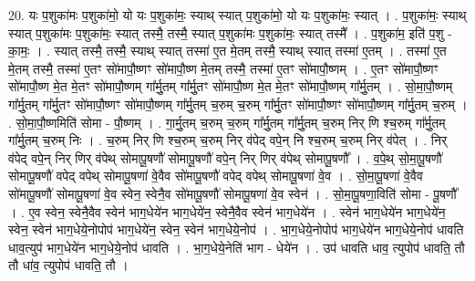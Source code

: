 \documentclass[17pt]{extarticle}
\begin{document}
20. यः प॒शुका॑मः प॒शुका॑मो॒ यो यः प॒शुका॑मः॒ स्याथ् स्यात् प॒शुका॑मो॒ यो यः प॒शुका॑मः॒ स्यात् । . प॒शुका॑मः॒ स्याथ् स्यात् प॒शुका॑मः प॒शुका॑मः॒ स्यात् तस्मै॒ तस्मै॒ स्यात् प॒शुका॑मः प॒शुका॑मः॒ स्यात् तस्मै᳚ । . प॒शुका॑म॒ इति॑ प॒शु - का॒मः॒ । . स्यात् तस्मै॒ तस्मै॒ स्याथ् स्यात् तस्मा॑ ए॒त मे॒तम् तस्मै॒ स्याथ् स्यात् तस्मा॑ ए॒तम् । . तस्मा॑ ए॒त मे॒तम् तस्मै॒ तस्मा॑ ए॒तꣳ सो॑मापौ॒ष्णꣳ सो॑मापौ॒ष्ण मे॒तम् तस्मै॒ तस्मा॑ ए॒तꣳ सो॑मापौ॒ष्णम् । . ए॒तꣳ सो॑मापौ॒ष्णꣳ सो॑मापौ॒ष्ण मे॒त मे॒तꣳ सो॑मापौ॒ष्णम् गा᳚र्मु॒तम् गा᳚र्मु॒तꣳ सो॑मापौ॒ष्ण मे॒त मे॒तꣳ सो॑मापौ॒ष्णम् गा᳚र्मु॒तम् । . सो॒मा॒पौ॒ष्णम् गा᳚र्मु॒तम् गा᳚र्मु॒तꣳ सो॑मापौ॒ष्णꣳ सो॑मापौ॒ष्णम् गा᳚र्मु॒तम् च॒रुम् च॒रुम् गा᳚र्मु॒तꣳ सो॑मापौ॒ष्णꣳ सो॑मापौ॒ष्णम् गा᳚र्मु॒तम् च॒रुम् । . सो॒मा॒पौ॒ष्णमिति॑ सोमा - पौ॒ष्णम् । . गा॒र्मु॒तम् च॒रुम् च॒रुम् गा᳚र्मु॒तम् गा᳚र्मु॒तम् च॒रुम् निर् णि श्च॒रुम् गा᳚र्मु॒तम् गा᳚र्मु॒तम् च॒रुम् निः । . च॒रुम् निर् णि श्च॒रुम् च॒रुम् निर् व॑पेद् वपे॒न् नि श्च॒रुम् च॒रुम् निर् व॑पेत् । . निर् व॑पेद् वपे॒न् निर् णिर् व॑पेथ् सोमापू॒षणौ॑ सोमापू॒षणौ॑ वपे॒न् निर् णिर् व॑पेथ् सोमापू॒षणौ᳚ । . व॒पे॒थ् सो॒मा॒पू॒षणौ॑ सोमापू॒षणौ॑ वपेद् वपेथ् सोमापू॒षणा॑ वे॒वैव सो॑मापू॒षणौ॑ वपेद् वपेथ् सोमापू॒षणा॑ वे॒व । . सो॒मा॒पू॒षणा॑ वे॒वैव सो॑मापू॒षणौ॑ सोमापू॒षणा॑ वे॒व स्वेन॒ स्वेनै॒व सो॑मापू॒षणौ॑ सोमापू॒षणा॑ वे॒व स्वेन॑ । . सो॒मा॒पू॒षणा॒विति॑ सोमा - पू॒षणौ᳚ । . ए॒व स्वेन॒ स्वेनै॒वैव स्वेन॑ भाग॒धेये॑न भाग॒धेये॑न॒ स्वेनै॒वैव स्वेन॑ भाग॒धेये॑न । . स्वेन॑ भाग॒धेये॑न भाग॒धेये॑न॒ स्वेन॒ स्वेन॑ भाग॒धेये॒नोपोप॑ भाग॒धेये॑न॒ स्वेन॒ स्वेन॑ भाग॒धेये॒नोप॑ । . भा॒ग॒धेये॒नोपोप॑ भाग॒धेये॑न भाग॒धेये॒नोप॑ धावति धाव॒त्युप॑ भाग॒धेये॑न भाग॒धेये॒नोप॑ धावति । . भा॒ग॒धेये॒नेति॑ भाग - धेये॑न । . उप॑ धावति धाव॒ त्युपोप॑ धावति॒ तौ तौ धा॑व॒ त्युपोप॑ धावति॒ तौ । \newline
\end{document}
